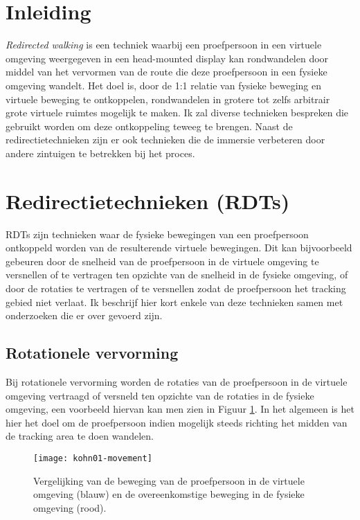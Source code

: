 \section{Inleiding}
\emph{Redirected walking} is een techniek waarbij een proefpersoon in een 
virtuele omgeving weergegeven in een head-mounted display kan rondwandelen door 
middel van het vervormen van de route die deze proefpersoon in een fysieke 
omgeving wandelt. Het doel is, door de 1:1 relatie van fysieke beweging en 
virtuele beweging te ontkoppelen, rondwandelen in grotere tot zelfs arbitrair 
grote virtuele ruimtes mogelijk te maken. Ik zal diverse technieken bespreken die
gebruikt worden om deze ontkoppeling teweeg te brengen. Naast de
redirectietechnieken zijn er ook technieken die de immersie verbeteren door
andere zintuigen te betrekken bij het proces.

\section{Redirectietechnieken (RDTs)}
RDTs zijn technieken waar de fysieke bewegingen van een proefpersoon ontkoppeld
worden van de resulterende virtuele bewegingen. Dit kan bijvoorbeeld gebeuren 
door de snelheid van de proefpersoon in de virtuele omgeving te versnellen of te
vertragen ten opzichte van de snelheid in de fysieke omgeving, of door de
rotaties te vertragen of te versnellen zodat de proefpersoon het tracking gebied
niet verlaat. Ik beschrijf hier kort enkele van deze technieken samen met 
onderzoeken die er over gevoerd zijn.


\subsection{Rotationele vervorming}
Bij rotationele vervorming worden de rotaties van de proefpersoon in de 
virtuele omgeving vertraagd of versneld ten opzichte van de rotaties in de
fysieke omgeving, een voorbeeld hiervan kan men zien in Figuur 
\ref{fig:kohn01-movement}. In het algemeen is het hier het doel om de
proefpersoon indien mogelijk steeds richting het midden van de tracking area
te doen wandelen.

\begin{figure}[h!]
    \centering
    \texttt{[image: kohn01-movement]}
    \caption{Vergelijking van de beweging van de proefpersoon in de virtuele
    omgeving (blauw) en de overeenkomstige beweging in de fysieke omgeving 
    (rood).\cite{kohn01}}
    \label{fig:kohn01-movement}
\end{figure}

